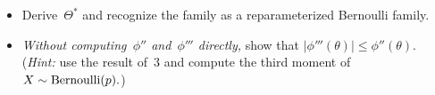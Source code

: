 \documentclass[11pt]{article}
\newcommand{\odima}[1]{{\color{red} #1}}
\newcommand{\R}{\mathds{R}}
\newcommand{\E}{\mathds{E}}
\newcommand{\Var}{\textup{Var}}
\newcommand{\cX}{\mathcal{X}}
\newcommand{\leqs}{\leqslant}
\renewcommand{\le}{\leqs}
\begin{document}
\begin{enumerate}
\begin{itemize}
\item Derive~$\Theta^*$ and recognize the family as a reparameterized Bernoulli family. 
\item {\em Without computing~$\phi''$ and~$\phi'''$ directly,} show that
$
|\phi'''(\theta)| \le \phi''(\theta).
$\\
({\em Hint:} use the result of~$3$ and compute the third moment of~$X \sim \textup{Bernoulli}(p).$)\\


\end{itemize}

\end{enumerate}



\newpage
\end{document}
